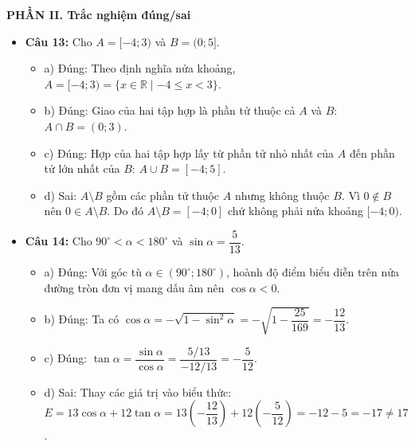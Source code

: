 \documentclass[12pt,a4paper]{article}
\begin{document}
\vspace{0.15cm}
\textbf{PHẦN II. Trắc nghiệm đúng/sai}
\begin{itemize}[leftmargin=0.6cm, itemsep=3pt]
    \item \textbf{Câu 13:} Cho $A = [-4; 3)$ và $B = (0; 5]$.
    \begin{itemize}
        \item a) Đúng: Theo định nghĩa nửa khoảng, $A = [-4; 3) = \{x \in \mathbb{R} \mid -4 \le x < 3\}$.
        \item b) Đúng: Giao của hai tập hợp là phần tử thuộc cả $A$ và $B$: $A \cap B = (0; 3)$.
        \item c) Đúng: Hợp của hai tập hợp lấy từ phần tử nhỏ nhất của $A$ đến phần tử lớn nhất của $B$: $A \cup B = [-4; 5]$.
        \item d) Sai: $A \setminus B$ gồm các phần tử thuộc $A$ nhưng không thuộc $B$. Vì $0 \notin B$ nên $0 \in A \setminus B$. Do đó $A \setminus B = [-4; 0]$ chứ không phải nửa khoảng $[-4; 0)$.
    \end{itemize}
    \item \textbf{Câu 14:} Cho $90^\circ < \alpha < 180^\circ$ và $\sin \alpha = \dfrac{5}{13}$.
    \begin{itemize}
        \item a) Đúng: Với góc tù $\alpha \in (90^\circ; 180^\circ)$, hoành độ điểm biểu diễn trên nửa đường tròn đơn vị mang dấu âm nên $\cos \alpha < 0$.
        \item b) Đúng: Ta có $\cos \alpha = -\sqrt{1 - \sin^2 \alpha} = -\sqrt{1 - \dfrac{25}{169}} = -\dfrac{12}{13}$.
        \item c) Đúng: $\tan \alpha = \dfrac{\sin \alpha}{\cos \alpha} = \dfrac{5/13}{-12/13} = -\dfrac{5}{12}$.
        \item d) Sai: Thay các giá trị vào biểu thức:
        $E = 13\cos \alpha + 12\tan \alpha = 13\left(-\dfrac{12}{13}\right) + 12\left(-\dfrac{5}{12}\right) = -12 - 5 = -17 \ne 17$.
    \end{itemize}
\end{itemize}
\end{document}
